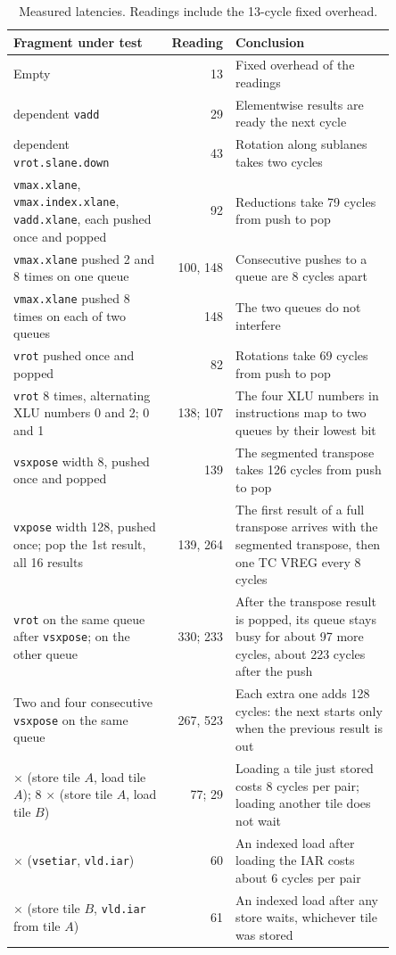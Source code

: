 \documentclass[sigconf,nonacm,balance=false]{acmart}
\newcommand{\code}[1]{\texttt{#1}}
\begin{document}
\begin{table}
\centering
\caption{Measured latencies. Readings include the 13-cycle fixed overhead.}
\label{tab:3}
\begin{tabular}{>{\raggedright\arraybackslash}p{0.42\linewidth}r>{\raggedright\arraybackslash}p{0.43\linewidth}}
\toprule
Fragment under test & Reading & Conclusion \\
\midrule
Empty & 13 & Fixed overhead of the readings \\
16 dependent \code{vadd} & 29 & Elementwise results are ready the next cycle \\
16 dependent \code{vrot.\allowbreak{}slane.\allowbreak{}down} & 43 & Rotation along sublanes takes two cycles \\
\code{vmax.\allowbreak{}xlane}, \code{vmax.\allowbreak{}index.\allowbreak{}xlane}, \code{vadd.\allowbreak{}xlane}, each pushed once and popped & 92 & Reductions take 79 cycles from push to pop \\
\code{vmax.\allowbreak{}xlane} pushed 2 and 8 times on one queue & 100, 148 & Consecutive pushes to a queue are 8 cycles apart \\
\code{vmax.\allowbreak{}xlane} pushed 8 times on each of two queues & 148 & The two queues do not interfere \\
\code{vrot} pushed once and popped & 82 & Rotations take 69 cycles from push to pop \\
\code{vrot} 8 times, alternating XLU numbers 0 and 2; 0 and 1 & 138; 107 & The four XLU numbers in instructions map to two queues by their lowest bit \\
\code{vsxpose} width 8, pushed once and popped & 139 & The segmented transpose takes 126 cycles from push to pop \\
\code{vxpose} width 128, pushed once; pop the 1st result, all 16 results & 139, 264 & The first result of a full transpose arrives with the segmented transpose, then one TC VREG every 8 cycles \\
4 \code{vrot} on the same queue after \code{vsxpose}; on the other queue & 330; 233 & After the transpose result is popped, its queue stays busy for about 97 more cycles, about 223 cycles after the push \\
Two and four consecutive \code{vsxpose} on the same queue & 267, 523 & Each extra one adds 128 cycles: the next starts only when the previous result is out \\
8 $\times$ (store tile $A$, load tile $A$); 8 $\times$ (store tile $A$, load tile $B$) & 77; 29 & Loading a tile just stored costs 8 cycles per pair; loading another tile does not wait \\
8 $\times$ (\code{vsetiar}, \code{vld.\allowbreak{}iar}) & 60 & An indexed load after loading the IAR costs about 6 cycles per pair \\
8 $\times$ (store tile $B$, \code{vld.\allowbreak{}iar} from tile $A$) & 61 & An indexed load after any store waits, whichever tile was stored \\
\bottomrule
\end{tabular}
\end{table}
\end{document}
